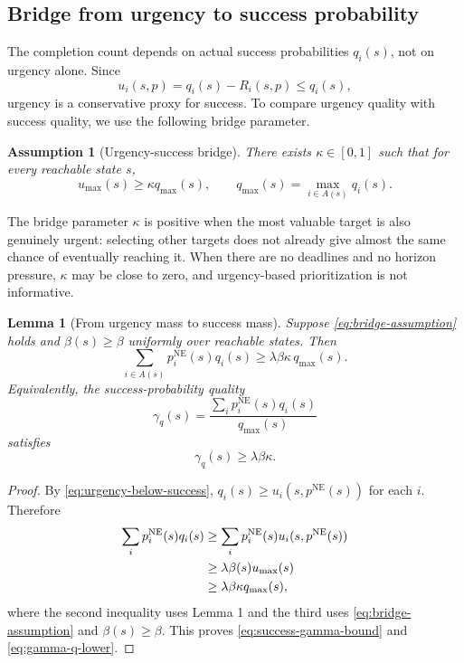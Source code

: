 \documentclass[11pt]{article}
\newtheorem{lemma}{Lemma}
\newtheorem{assumption}{Assumption}
\begin{document}
\subsection{Bridge from urgency to success probability}

The completion count depends on actual success probabilities $q_i(s)$, not on urgency alone. Since
\begin{equation}
  u_i(s,p) = q_i(s)-R_i(s,p) \le q_i(s),
  \label{eq:urgency-below-success}
\end{equation}
urgency is a conservative proxy for success. To compare urgency quality with success quality, we use the following
bridge parameter.

\begin{assumption}[Urgency-success bridge]
There exists $\kappa\in[0,1]$ such that for every reachable state $s$,
\begin{equation}
  u_{\max}(s) \ge \kappa q_{\max}(s),
  \qquad
  q_{\max}(s)=\max_{i\in A(s)}q_i(s).
  \label{eq:bridge-assumption}
\end{equation}
\end{assumption}

The bridge parameter $\kappa$ is positive when the most valuable target is also genuinely urgent: selecting other
targets does not already give almost the same chance of eventually reaching it. When there are no deadlines and no
horizon pressure, $\kappa$ may be close to zero, and urgency-based prioritization is not informative.

\begin{lemma}[From urgency mass to success mass]
Suppose \eqref{eq:bridge-assumption} holds and $\beta(s)\ge \beta$ uniformly over reachable states. Then
\begin{equation}
  \sum_{i\in A(s)}p_i^{\mathrm{NE}}(s)q_i(s)
  \ge
  \lambda\beta\kappa\, q_{\max}(s).
  \label{eq:success-gamma-bound}
\end{equation}
Equivalently, the success-probability quality
\begin{equation}
  \gamma_q(s)
  =
  \frac{\sum_i p_i^{\mathrm{NE}}(s)q_i(s)}{q_{\max}(s)}
  \label{eq:gamma-q-def}
\end{equation}
satisfies
\begin{equation}
  \gamma_q(s)\ge \lambda\beta\kappa.
  \label{eq:gamma-q-lower}
\end{equation}
\end{lemma}

\begin{proof}
By \eqref{eq:urgency-below-success}, $q_i(s)\ge u_i(s,p^{\mathrm{NE}}(s))$ for each $i$. Therefore
\begin{align}
  \sum_i p_i^{\mathrm{NE}}(s)q_i(s)
  &\ge
  \sum_i p_i^{\mathrm{NE}}(s)u_i(s,p^{\mathrm{NE}}(s)) \notag\\
  &\ge
  \lambda\beta(s)u_{\max}(s) \notag\\
  &\ge
  \lambda\beta\kappa q_{\max}(s), \label{eq:success-gamma-proof}
\end{align}
where the second inequality uses Lemma 1 and the third uses \eqref{eq:bridge-assumption} and $\beta(s)\ge\beta$.
This proves \eqref{eq:success-gamma-bound} and \eqref{eq:gamma-q-lower}.
\end{proof}
\end{document}
